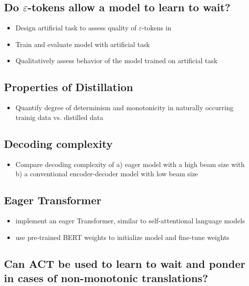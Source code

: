 \documentclass[english]{uzhpub}
\begin{document}
\subsection{Do $\varepsilon$-tokens allow a model to learn to wait?}

\begin{itemize}
	\item Design artificial task to assess quality of $\varepsilon$-tokens in \cite{youmaynotneedattention}
	\item Train and evaluate model with artificial task
	\item Qualitatively assess behavior of the model trained on artificial task
\end{itemize}

\subsection{Properties of Distillation}

\begin{itemize}
	\item Quantify degree of determinism and monotonicity in naturally occurring trainig data vs. distilled data
\end{itemize}

\subsection{Decoding complexity}

\begin{itemize}
	\item Compare decoding complexity of a) eager model with a high beam size with b) a conventional encoder-decoder model with low beam size
\end{itemize}

\subsection{Eager Transformer}

\begin{itemize}
	\item implement an eager Transformer, similar to self-attentional language models
	\item use pre-trained BERT weights \cite{devlin-etal-2019-bert} to initialize model and fine-tune weights
\end{itemize}

\subsection{Can ACT be used to learn to wait and ponder in cases of non-monotonic translations?}
\end{document}
